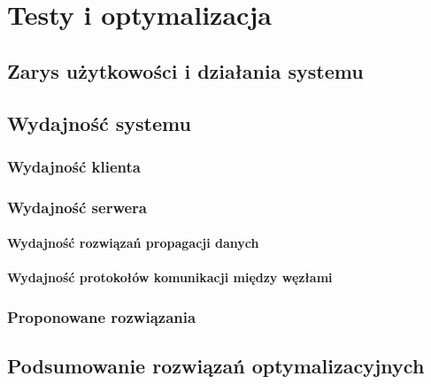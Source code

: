\chapter{Testy i optymalizacja}
\label{cha:testyIOptymalizacje}

\section{Zarys użytkowości i działania systemu}
\label{sec:UX}

\section{Wydajność systemu}
\label{sec:wydajnosc}

\subsection{Wydajność klienta}
\label{sec:wydajnoscKlient}

\subsection{Wydajność serwera}
\label{sec:wydajnoscNode}

\subsubsection{Wydajność rozwiązań propagacji danych}
\subsubsection{Wydajność protokołów komunikacji między węzłami}

\subsection{Proponowane rozwiązania}

\section{Podsumowanie rozwiązań optymalizacyjnych}
\label{sec:optSummary}

